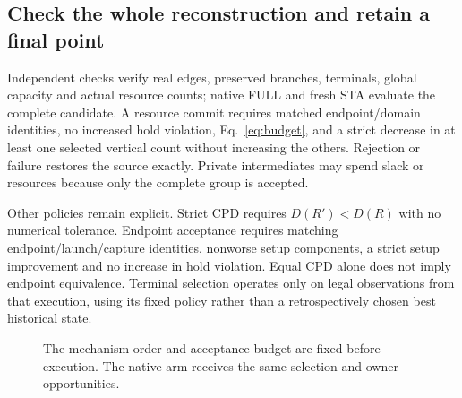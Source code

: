 \documentclass[conference,10pt]{IEEEtran}
\begin{document}
\subsection{Check the whole reconstruction and retain a final point}
Independent checks verify real edges, preserved branches, terminals, global capacity and actual resource counts; native FULL and fresh STA evaluate the complete candidate. A resource commit requires matched endpoint/domain identities, no increased hold violation, Eq.~\ref{eq:budget}, and a strict decrease in at least one selected vertical count without increasing the others. Rejection or failure restores the source exactly. Private intermediates may spend slack or resources because only the complete group is accepted.

Other policies remain explicit. Strict CPD requires $D(R')<D(R)$ with no numerical tolerance. Endpoint acceptance requires matching endpoint/launch/capture identities, nonworse setup components, a strict setup improvement and no increase in hold violation. Equal CPD alone does not imply endpoint equivalence. Terminal selection operates only on legal observations from that execution, using its fixed policy rather than a retrospectively chosen best historical state.

\begin{figure}[t]
\centering\footnotesize
{}
\caption{The mechanism order and acceptance budget are fixed before execution. The native arm receives the same selection and owner opportunities.}
\label{fig:algorithm}
\end{figure}
\end{document}
